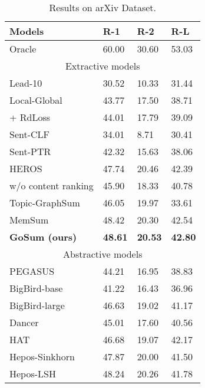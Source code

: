 \documentclass[11pt,a4paper]{article}
\begin{document}
\begin{table}[t]
  \centering
  \begin{tabular}{p{36mm}|p{8mm}p{8mm}p{8mm}}\toprule
        Models          &  R-1  &  R-2  &  R-L   \\ \midrule
        Oracle                          & 60.00 & 30.60 & 53.03  \\  \midrule
        \multicolumn{4}{c}{Extractive models}  \\ \midrule
Lead-10                       & 30.52 & 10.33 & 31.44  \\
          Local-Global                  & 43.77 & 17.50 & 38.71  \\
          \quad + RdLoss                & 44.01 & 17.79 & 39.09  \\
          Sent-CLF                      & 34.01 &  8.71 & 30.41  \\
          Sent-PTR                      & 42.32 & 15.63 & 38.06  \\
          HEROS                         & 47.74 & 20.46 & 42.39  \\
          \quad w/o content ranking     & 45.90 & 18.33 & 40.78  \\
          Topic-GraphSum                & 46.05 & 19.97 & 33.61  \\
          MemSum                        & 48.42 & 20.30 & 42.54  \\
          \textbf{GoSum (ours)}         & \textbf{48.61} & \textbf{20.53} & \textbf{42.80}  \\ \midrule
          \multicolumn{4}{c}{Abstractive models}  \\ \midrule
          PEGASUS                       & 44.21 & 16.95 & 38.83  \\
          BigBird-base                  & 41.22 & 16.43 & 36.96  \\
          BigBird-large                 & 46.63 & 19.02 & 41.17  \\
          Dancer                        & 45.01 & 17.60 & 40.56  \\
          HAT                           & 46.68 & 19.07 & 42.17  \\
          Hepos-Sinkhorn                & 47.87 & 20.00 & 41.50  \\
          Hepos-LSH                     & 48.24 & 20.26 & 41.78  \\
          \bottomrule
  \end{tabular}
  \caption{Results on arXiv Dataset.} \label{tab:sota_arxiv}
\end{table}
\end{document}
